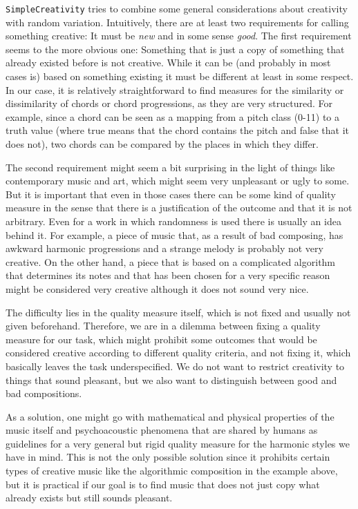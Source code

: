 \texttt{SimpleCreativity} tries to combine some general considerations about creativity with random variation.
Intuitively, there are at least two requirements for calling something creative:
It must be \emph{new} and in some sense \emph{good}.
The first requirement seems to the more obvious one:
Something that is just a copy of something that already existed before is not creative.
While it can be (and probably in most cases is) based on something existing it must be different at least in some respect.
In our case, it is relatively straightforward to find measures for the similarity or dissimilarity of chords or chord progressions, as they are very structured.
For example, since a chord can be seen as a mapping from a pitch class (0-11) to a truth value (where true means that the chord contains the pitch and false that it does not), two chords can be compared by the places in which they differ.

The second requirement might seem a bit surprising in the light of things like contemporary music and art, which might seem very unpleasant or ugly to some.
But it is important that even in those cases there can be some kind of quality measure in the sense that there is a justification of the outcome and that it is not arbitrary.
Even for a work in which randomness is used there is usually an idea behind it.
For example, a piece of music that, as a result of bad composing, has awkward harmonic progressions and a strange melody is probably not very creative.
On the other hand, a piece that is based on a complicated algorithm that determines its notes and that has been chosen for a very specific reason might be considered very creative although it does not sound very nice.

The difficulty lies in the quality measure itself, which is not fixed and usually not given beforehand.
Therefore, we are in a dilemma between fixing a quality measure for our task, which might prohibit some outcomes that would be considered creative according to different quality criteria, and not fixing it, which basically leaves the task underspecified.
We do not want to restrict creativity to things that sound pleasant, but we also want to distinguish between good and bad compositions.

As a solution, one might go with mathematical and physical properties of the music itself and psychoacoustic phenomena that are shared by humans as guidelines for a very general but rigid quality measure for the harmonic styles we have in mind.
This is not the only possible solution since it prohibits certain types of creative music like the algorithmic composition in the example above, but it is practical if our goal is to find music that does not just copy what already exists but still sounds pleasant.

